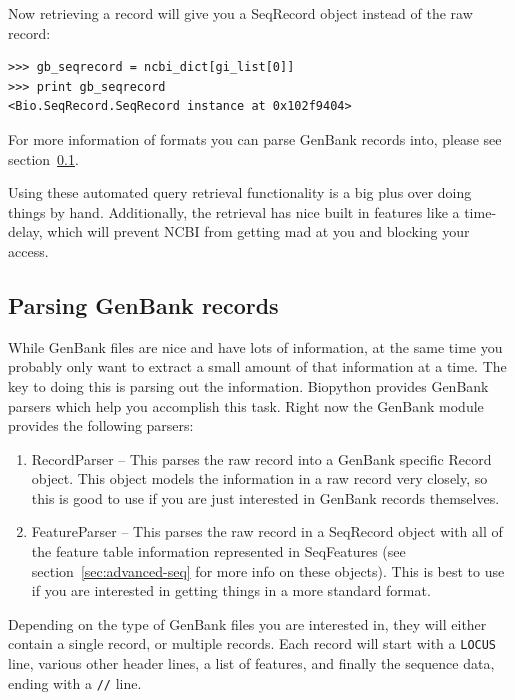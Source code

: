 \documentclass{report}
\begin{document}
Now retrieving a record will give you a SeqRecord object instead of the raw record:

\begin{verbatim}
>>> gb_seqrecord = ncbi_dict[gi_list[0]]
>>> print gb_seqrecord
<Bio.SeqRecord.SeqRecord instance at 0x102f9404>
\end{verbatim}

For more information of formats you can parse GenBank records into, please see section~\ref{sec:gb-parsing}.

Using these automated query retrieval functionality is a big plus over doing things by hand. Additionally, the retrieval has nice built in features like a time-delay, which will prevent NCBI from getting mad at you and blocking your access.

\subsection{Parsing GenBank records}
\label{sec:gb-parsing}

While GenBank files are nice and have lots of information, at the same time you probably only want to extract a small amount of that information at a time. The key to doing this is parsing out the information. Biopython provides GenBank parsers which help you accomplish this task. Right now the GenBank module provides the following parsers:

\begin{enumerate}
  \item RecordParser -- This parses the raw record into a GenBank specific Record object. This object models the information in a raw record very closely, so this is good to use if you are just interested in GenBank records themselves.

  \item FeatureParser -- This parses the raw record in a SeqRecord object with all of the feature table information represented in SeqFeatures (see section~\ref{sec:advanced-seq} for more info on these objects). This is best to use if you are interested in getting things in a more standard format.
\end{enumerate}

Depending on the type of GenBank files you are interested in, they will either contain a single record, or multiple records.  Each record will start with a {\tt LOCUS} line, various other header lines, a list of features, and finally the sequence data, ending with a {\tt //} line.
\end{document}
